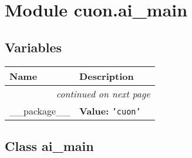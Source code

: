%
%
%


\section{Module cuon.ai\_main}

    \label{cuon:ai_main}


  \subsection{Variables}

    \vspace{-1cm}
\hspace{\varindent}\begin{longtable}{|p{\varnamewidth}|p{\vardescrwidth}|l}
\cline{1-2}
\cline{1-2} \centering \textbf{Name} & \centering \textbf{Description}& \\
\cline{1-2}
\endhead\cline{1-2}\multicolumn{3}{r}{\small\textit{continued on next page}}\\\endfoot\cline{1-2}
\endlastfoot\raggedright \_\-\_\-p\-a\-c\-k\-a\-g\-e\-\_\-\_\- & \raggedright \textbf{Value:} 
{\tt \texttt{'}\texttt{cuon}\texttt{'}}&\\
\cline{1-2}
\end{longtable}



\subsection{Class ai\_main}

